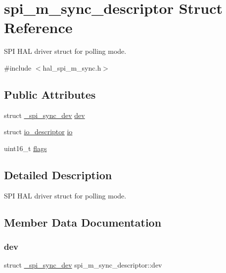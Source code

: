 \hypertarget{structspi__m__sync__descriptor}{}\section{spi\+\_\+m\+\_\+sync\+\_\+descriptor Struct Reference}
\label{structspi__m__sync__descriptor}


S\+PI H\+AL driver struct for polling mode.  




{\ttfamily \#include $<$hal\+\_\+spi\+\_\+m\+\_\+sync.\+h$>$}

\subsection*{Public Attributes}
\begin{DoxyCompactItemize}
\item 
struct \hyperlink{struct__spi__sync__dev}{\+\_\+spi\+\_\+sync\+\_\+dev} \hyperlink{structspi__m__sync__descriptor_a74087795de55f1126103f5dcdd223f5f}{dev}
\item 
struct \hyperlink{structio__descriptor}{io\+\_\+descriptor} \hyperlink{structspi__m__sync__descriptor_a2a50cfeb0b6f494fb4ad77db7f44789d}{io}
\item 
uint16\+\_\+t \hyperlink{structspi__m__sync__descriptor_a076a4812ce1f777bfdb71891333ed95c}{flags}
\end{DoxyCompactItemize}


\subsection{Detailed Description}
S\+PI H\+AL driver struct for polling mode. 



\subsection{Member Data Documentation}
\mbox{\label{structspi__m__sync__descriptor_a74087795de55f1126103f5dcdd223f5f}} 
\subsubsection{\texorpdfstring{dev}{dev}}
{\footnotesize\ttfamily struct \hyperlink{struct__spi__sync__dev}{\+\_\+spi\+\_\+sync\+\_\+dev} spi\+\_\+m\+\_\+sync\+\_\+descriptor\+::dev}


